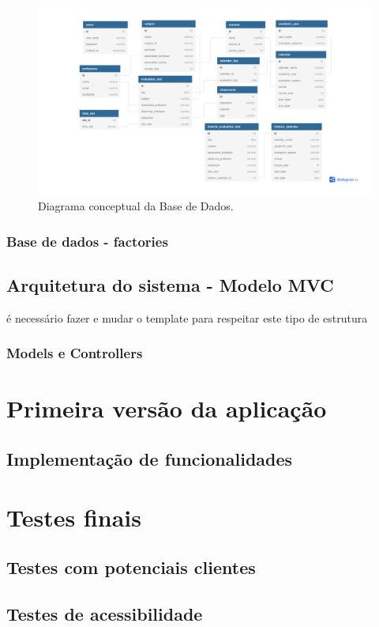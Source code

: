 \documentclass[11pt, twoside]{report}
\begin{document}
	\begin{figure}[H]
		\centering
		\includegraphics[width=0.95\linewidth]{image/Calendario_DB}
		\caption{Diagrama conceptual da Base de Dados.}
		\label{fig:calendariodb}
	\end{figure}
	
	
	\subsection{Base de dados - factories}
	\section{Arquitetura do sistema - Modelo MVC}
	é necessário fazer e mudar o template para respeitar este tipo de estrutura
	\subsection{Models e Controllers}
	
	\chapter{Primeira versão da aplicação}
	\section{Implementação de funcionalidades}
	
	\chapter{Testes finais}
	\section{Testes com potenciais clientes}
	\section{Testes de acessibilidade}
\end{document}
